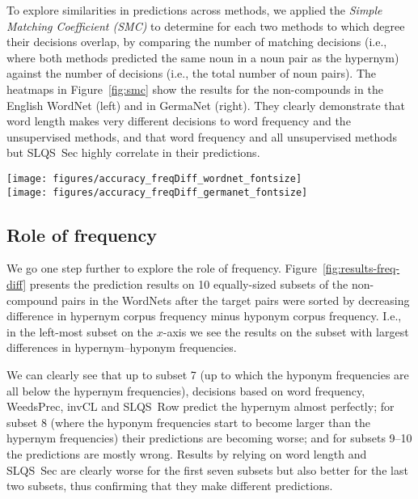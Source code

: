 \documentclass[11pt,a4paper]{article}
\begin{document}
To explore similarities in predictions across methods, we applied the
\textit{Simple Matching Coefficient (SMC)} \cite{Sokal:58} to
determine for each two methods to which degree their decisions
overlap, by comparing the number of matching decisions (i.e., where
both methods predicted the same noun in a noun pair as the hypernym)
against the number of decisions (i.e., the total number of noun
pairs). The heatmaps in Figure~\ref{fig:smc} show the results for the
non-compounds in the English WordNet (left) and in GermaNet
(right). They clearly demonstrate that word length makes very
different decisions to word frequency and the unsupervised methods,
and that word frequency and all unsupervised methods but SLQS~Sec
highly correlate in their predictions.

\begin{figure*}[ht!]
  \centering
  \texttt{[image: figures/accuracy\_freqDiff\_wordnet\_fontsize]}
  \vspace{+1mm}\\
  \texttt{[image: figures/accuracy\_freqDiff\_germanet\_fontsize]}
  \caption{Prediction results for WordNet (above) and GermaNet (below)
    non-compound pairs across equally-sized subsets of target pairs
    sorted by difference in hypernym frequency and hyponym frequency.}
  \label{fig:results-freq-diff}
\end{figure*}


\subsection{Role of frequency}

We go one step further to explore the role of
frequency. Figure~\ref{fig:results-freq-diff} presents the prediction
results on 10 equally-sized subsets of the non-compound pairs in the
WordNets after the target pairs were sorted by decreasing difference
in hypernym corpus frequency minus hyponym corpus frequency. I.e., in
the left-most subset on the $x$-axis we see the results on the subset
with largest differences in hypernym--hyponym frequencies.

We can clearly see that up to subset 7 (up to which the hyponym
frequencies are all below the hypernym frequencies), decisions based
on word frequency, WeedsPrec, invCL and SLQS~Row predict the hypernym
almost perfectly; for subset 8 (where the hyponym frequencies start to
become larger than the hypernym frequencies) their predictions are
becoming worse; and for subsets 9--10 the predictions are mostly
wrong. Results by relying on word length and SLQS~Sec are clearly
worse for the first seven subsets but also better for the last two
subsets, thus confirming that they make different predictions.
\end{document}
